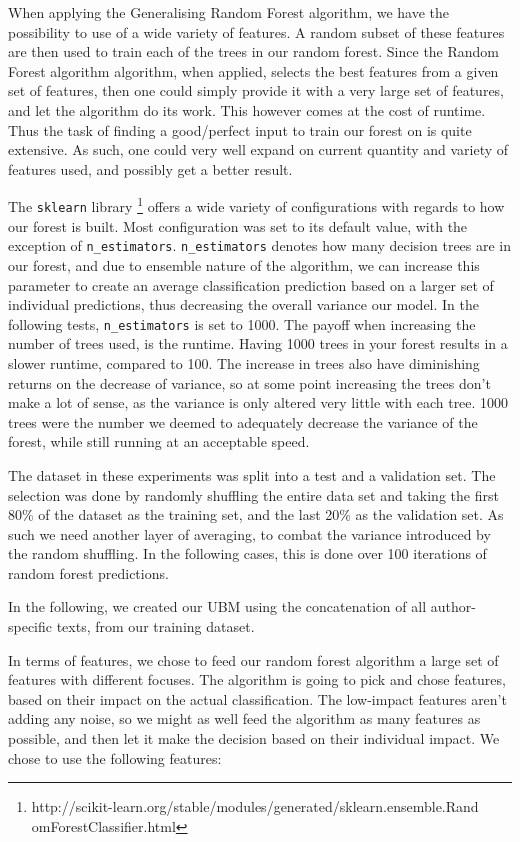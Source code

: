 When applying the Generalising Random Forest algorithm, we have the possibility
to use of a wide variety of features. A random subset of these features are then
used to train each of the trees in our random forest. Since the Random Forest
algorithm algorithm, when applied, selects the best features from a given set of
features, then one could simply provide it with a very large set of features,
and let the algorithm do its work. This however comes at the cost of runtime.
Thus the task of finding a good/perfect input to train our forest on is quite
extensive. As such, one could very well expand on current quantity and variety
of features used, and possibly get a better result.

The \texttt{sklearn} library
\footnote{http://scikit-learn.org/stable/modules/generated/sklearn.ensemble.Rand
omForestClassifier.html} offers a wide variety of configurations with regards to
how our forest is built. Most configuration was set to its default value, with
the exception of \texttt{n\_estimators}. \texttt{n\_estimators} denotes how many
decision trees are in our forest, and due to ensemble nature of the algorithm,
we can increase this parameter to create an average classification prediction
based on a larger set of individual predictions, thus decreasing the overall
variance our model. In the following tests, \texttt{n\_estimators} is set to
1000. The payoff when increasing the number of trees used, is the runtime.
Having 1000 trees in your forest results in a slower runtime, compared to 100.
The increase in trees also have diminishing returns on the decrease of variance,
so at some point increasing the trees don't make a lot of sense, as the
variance is only altered very little with each tree. 1000 trees were the number
we deemed to adequately decrease the variance of the forest, while still running
at an acceptable speed.

The dataset in these experiments was split into a test and a validation set.
The selection was done by randomly shuffling the entire data set and taking
the first 80\% of the dataset as the training set, and the last 20\% as the
validation set. As such we need another layer of averaging, to combat the
variance introduced by the random shuffling. In the following cases, this is
done over 100 iterations of random forest predictions.

In the following, we created our \gls{UBM} using the concatenation of all
author-specific texts, from our training dataset.

In terms of features, we chose to feed our random forest algorithm a large set
of features with different focuses. The algorithm is going to pick and chose
features, based on their impact on the actual classification. The low-impact
features aren't adding any noise, so we might as well feed the algorithm as
many features as possible, and then let it make the decision based on their
individual impact. We chose to use the following features:

